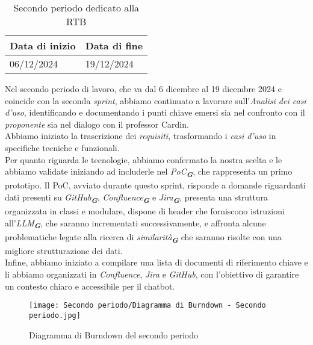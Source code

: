 \newpage
{}
\label{sec:secondo periodo}
\begin{table}[h!]
    \centering
    \renewcommand{\arraystretch}{1.5} %
    \begin{tabularx}{\textwidth}{|X|X|}\hline
    \rowcolor[HTML]{FFD700} 
    \textbf{Data di inizio} & \textbf{Data di fine} \\ \hline
    06/12/2024 & 19/12/2024 \\ \hline
    \end{tabularx}
    \caption{Secondo periodo dedicato alla RTB}
\end{table}
Nel secondo periodo di lavoro, che va dal 6 dicembre al 19 dicembre 2024 e coincide con la seconda \textit{sprint}, abbiamo continuato a lavorare sull’\emph{Analisi dei casi d’uso}, identificando e documentando i punti chiave emersi sia nel confronto con il \emph{proponente} sia nel dialogo con il professor Cardin.\\
Abbiamo iniziato la trascrizione dei \emph{requisiti}, trasformando i \emph{casi d’uso} in specifiche tecniche e funzionali.\\
Per quanto riguarda le tecnologie, abbiamo confermato la nostra scelta e le abbiamo validate iniziando ad includerle nel \emph{PoC}\textsubscript{\textit{\textbf{G}}}, che rappresenta un primo prototipo. Il PoC, avviato durante questo sprint, risponde a domande riguardanti dati presenti su \emph{GitHub}\textsubscript{\textit{\textbf{G}}},
\emph{Confluence}\textsubscript{\textit{\textbf{G}}} e \emph{Jira}\textsubscript{\textit{\textbf{G}}}, presenta una struttura organizzata in classi e modulare, dispone di header che forniscono istruzioni all'\emph{LLM}\textsubscript{\textit{\textbf{G}}}, che saranno incrementati successivamente, e affronta alcune problematiche legate alla
ricerca di \emph{similarità}\textsubscript{\textit{\textbf{G}}} che saranno risolte con una migliore strutturazione dei dati. \\
Infine, abbiamo iniziato a compilare una lista di documenti di riferimento chiave e li abbiamo organizzati in \emph{Confluence}, \emph{Jira} e \emph{GitHub}, con l’obiettivo di garantire un contesto chiaro e accessibile per il chatbot.

\newpage
\begin{figure}[h] 
    \centering
    \texttt{[image: Secondo periodo/Diagramma di Burndown - Secondo periodo.jpg]}
    \caption{Diagramma di Burndown del secondo periodo} 
    \label{fig: Diagramma di Burndown del secondo periodo}
\end{figure}


